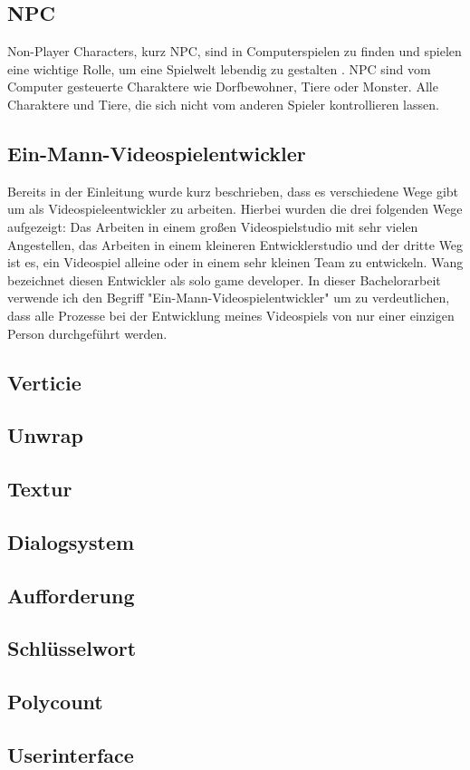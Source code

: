 \subsection{NPC}
Non-Player Characters, kurz NPC, sind in Computerspielen zu finden und spielen eine wichtige Rolle, um eine Spielwelt lebendig zu gestalten \autocite[S. 293]{hack2018}. NPC sind vom Computer gesteuerte Charaktere wie Dorfbewohner, Tiere oder Monster. Alle Charaktere und Tiere, die sich nicht vom anderen Spieler kontrollieren lassen\autocite[S.113]{breuer2012}.

\subsection{Ein-Mann-Videospielentwickler}
Bereits in der Einleitung wurde kurz beschrieben, dass es verschiedene Wege gibt um als Videospieleentwickler zu arbeiten. Hierbei wurden die drei folgenden Wege aufgezeigt: Das Arbeiten in einem großen Videospielstudio mit sehr vielen Angestellen, das Arbeiten in einem kleineren Entwicklerstudio und der dritte Weg ist es, ein Videospiel alleine oder in einem sehr kleinen Team zu entwickeln. Wang \autocite[S.251]{wang2023} bezeichnet diesen Entwickler als solo game developer. In dieser Bachelorarbeit verwende ich den Begriff "Ein-Mann-Videospielentwickler" um zu verdeutlichen, dass alle Prozesse bei der Entwicklung meines Videospiels von nur einer einzigen Person durchgeführt werden. 

\subsection{Verticie}
\subsection{Unwrap}
\subsection{Textur}
\subsection{Dialogsystem}
\subsection{Aufforderung}
\subsection{Schlüsselwort}
\subsection{Polycount}
\subsection{Userinterface}